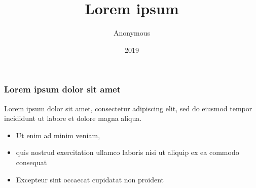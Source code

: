 \documentclass[aspectratio=169]{beamer}
\title{Lorem ipsum}
\author{Anonymous}
\institute{University of Trento}
\date{2019}
\begin{document}
 
 
\begin{frame}
\frametitle{Lorem ipsum dolor sit amet}

Lorem ipsum dolor sit amet, consectetur adipiscing elit, sed do eiusmod tempor incididunt ut labore et dolore magna aliqua.

\begin{itemize}
	\item Ut enim ad minim veniam,
	\item quis nostrud exercitation ullamco laboris nisi ut aliquip ex ea commodo consequat
	\item Excepteur sint occaecat cupidatat non proident
\end{itemize}

\end{frame}
 
\end{document}
